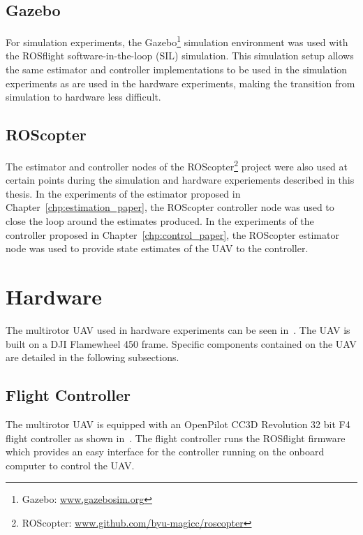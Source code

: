 \subsection {Gazebo}
For simulation experiments, the Gazebo\footnote{Gazebo:
\href{www.gazebosim.org}{www.gazebosim.org}} simulation environment was used with the ROSflight software-in-the-loop
(SIL) simulation. This simulation setup allows the
same estimator and controller implementations to
be used in the simulation experiments as are used in the hardware experiments,
making the transition from simulation to hardware less difficult.

\subsection {ROScopter}
The estimator and controller nodes of the ROScopter\footnote{ROScopter:
\href{www.github.com/byu-magicc/roscopter}{www.github.com/byu-magicc/roscopter}}
project were also used at certain points during the simulation and hardware
experiements described in this thesis. In the experiments of the estimator proposed in
Chapter~\ref{chp:estimation_paper}, the ROScopter controller node was used to
close the loop around the estimates produced. In the experiments of the 
controller proposed in Chapter~\ref{chp:control_paper}, the ROScopter estimator node
was used to provide state estimates of the UAV to the controller.

\section{Hardware}
The multirotor UAV used in hardware experiments can be seen
in~. The UAV is built on a DJI Flamewheel 450 frame.
Specific components contained on the UAV are detailed in the following
subsections.

\subsection{Flight Controller}
The multirotor UAV is equipped with an OpenPilot CC3D Revolution 32 bit F4
flight controller as shown in~. The flight controller runs the
ROSflight firmware which provides an easy interface
for the controller running on the onboard computer to control the UAV.


